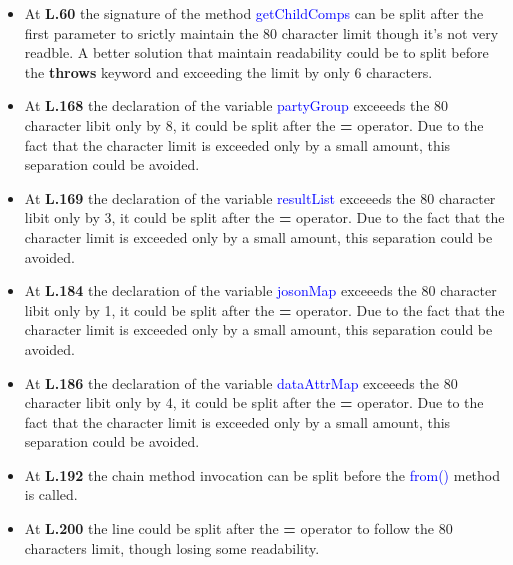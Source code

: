 \begin{enumerate}
    \begin{itemize}

      \item At \textbf{L.60} the signature of the method
        \textcolor{blue}{getChildComps} can be split after the first parameter
        to srictly maintain the 80 character limit though it's not very
        readble. A better solution that maintain readability could be to split
        before the \textbf{throws} keyword and exceeding the limit by only 6
        characters.

      \item At \textbf{L.168} the declaration of the variable
        \textcolor{blue}{partyGroup} exceeeds the 80 character libit only by
        8, it could be split after the \textbf{=} operator. Due to the fact
        that the character limit is exceeded only by a small amount, this
        separation could be avoided.

      \item At \textbf{L.169} the declaration of the variable
        \textcolor{blue}{resultList} exceeeds the 80 character libit only by
        3, it could be split after the \textbf{=} operator. Due to the fact
        that the character limit is exceeded only by a small amount, this
        separation could be avoided.

      \item At \textbf{L.184} the declaration of the variable
        \textcolor{blue}{josonMap} exceeeds the 80 character libit only by
        1, it could be split after the \textbf{=} operator. Due to the fact
        that the character limit is exceeded only by a small amount, this
        separation could be avoided.

      \item At \textbf{L.186} the declaration of the variable
        \textcolor{blue}{dataAttrMap} exceeeds the 80 character libit only by
        4, it could be split after the \textbf{=} operator. Due to the fact
        that the character limit is exceeded only by a small amount, this
        separation could be avoided.

      \item At \textbf{L.192} the chain method invocation can be split before
        the \textcolor{blue}{from()} method is called.

      \item At \textbf{L.200} the line could be split after the \textbf{=}
        operator to follow the 80 characters limit, though losing some
        readability.


\end{itemize}
\end{enumerate}
